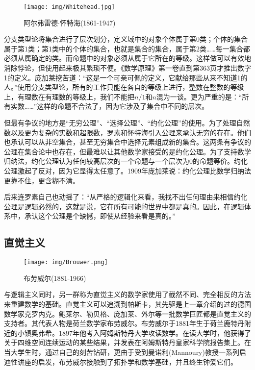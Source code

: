 \documentclass[b5paper]{ctexart}
\begin{document}
\begin{wrapfigure}{R}{0.4\textwidth}
 \centering
 \texttt{[image: img/Whitehead.jpg]}
 \caption{阿尔弗雷德$\cdot$怀特海(1861-1947)}
 \label{fig:Whitehead}
\end{wrapfigure}

分支类型论将集合进行了层次划分，定义域中的对象个体属于第0类；个体的集合属于第1类；第1类中的个体的集合，也就是集合的集合，属于第2类……每一集合都必须从属确定的类。而命题中的对象必须从属于它所在的等级。这样做可以有效地消除悖论，但使用起来极其繁琐不便。《数学原理》第一卷直到第363页才推出数字1的定义。庞加莱挖苦道：“这是一个可亲可佩的定义，它献给那些从来不知道1的人。”使用分支类型论，所有的工作只能在各自的等级上进行，整数在整数的等级上，有理数在有理数的等级上，我们不能把$n/1$和$n$混为一谈。更为严重的是：“所有实数……”这样的命题不合法了，因为它涉及了集合中不同的层次。

但最有争议的地方是“无穷公理”、“选择公理”、“约化公理”的使用。为了处理自然数以及更为复杂的实数和超限数，罗素和怀特海引入公理来承认无穷的存在。他们也承认可以从非空集合，甚至无穷集合中选择元素组成新的集合。这两条有争议的公理在集合论中也存在，但最难以让其他数学家接受的是约化公理。为了支持数学归纳法，约化公理认为任何较高层次的一个命题与一个层次为0的命题等价。约化公理激起了反对，因为它显得太任意了。1909年庞加莱说：约化公理比数学归纳法更靠不住，更含糊不清。

后来连罗素自己也动摇了：“从严格的逻辑化来看，我找不出任何理由来相信约化公理是逻辑必然的，这就是说，它在所有可能的世界中都是真的。因此，在逻辑体系中，承认这个公理是个缺憾，即使从经验来看是真的。”\cite{M-Kline-2007}

\subsection{直觉主义}

\begin{wrapfigure}{L}{0.4\textwidth}
 \centering
 \texttt{[image: img/Brouwer.png]}
 \caption{布劳威尔(1881-1966)}
 \label{fig:Brouwer}
\end{wrapfigure}

与逻辑主义同时，另一群称为直觉主义的数学家使用了截然不同、完全相反的方法来重建数学的基础。直觉主义可以追溯到帕斯卡，其先驱是上一章介绍的过的德国数学家克罗内克。鲍莱尔、勒贝格、庞加莱、外尔等一批数学巨匠都是直觉主义的支持者。其代表人物是荷兰数学家布劳威尔。布劳威尔于1881年生于荷兰鹿特丹附近的小镇奥弗希。1897年他考入阿姆斯特丹大学攻读数学。在读大学时，他获得了关于四维空间连续运动的某些结果，并发表在阿姆斯特丹皇家科学院报告集上。在当大学生时，通过自己的刻苦钻研，更由于受到曼诺利(Mannoury)教授一系列启迪性讲座的启发，布劳威尔接触到了拓扑学和数学基础，并且终生钟爱它们。
\end{document}
